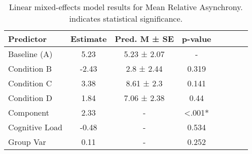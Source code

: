 
    \begin{table}[H]
    \centering
    \begin{small}
    \begin{tabular}{lccccccc}
\toprule
Predictor & Estimate & Pred. M ± SE & p-value \\
\midrule
Baseline (A) & 5.23 & 5.23 ± 2.07 & - \\
Condition B & -2.43 & 2.8 ± 2.44 & 0.319 \\
Condition C & 3.38 & 8.61 ± 2.3 & 0.141 \\
Condition D & 1.84 & 7.06 ± 2.38 & 0.44 \\
Component & 2.33 & - & <.001* \\
Cognitive Load & -0.48 & - & 0.534 \\
Group Var & 0.11 & - & 0.252 \\
\bottomrule
\end{tabular}

    \end{small}
    \caption[Linear mixed-effects model results for Mean Relative Asynchrony]{Linear mixed-effects model results for Mean Relative Asynchrony. \newline * indicates statistical significance.}
    \label{tab:meanrelativeasynchrony}

    \end{table}